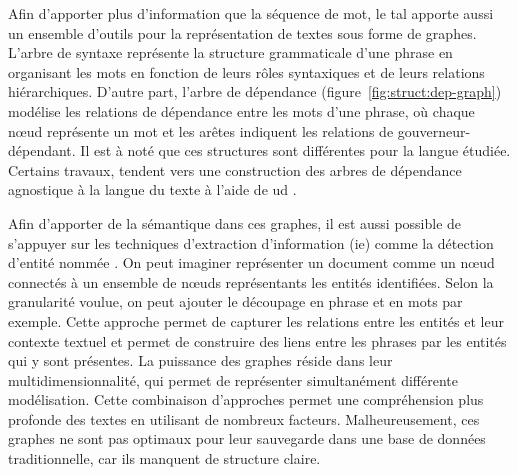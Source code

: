 Afin d'apporter plus d'information que la séquence de mot, le \gls{tal} apporte aussi un ensemble d'outils pour la représentation de textes sous forme de graphes.
L'arbre de syntaxe représente la structure grammaticale d'une phrase en organisant les mots en fonction de leurs rôles syntaxiques et de leurs relations hiérarchiques.
D'autre part, l'arbre de dépendance (figure~\ref{fig:struct:dep-graph}) modélise les relations de dépendance entre les mots d'une phrase, où chaque nœud représente un mot et les arêtes indiquent les relations de gouverneur-dépendant.
Il est à noté que ces structures sont différentes pour la langue étudiée.
Certains travaux, tendent vers une construction des arbres de dépendance agnostique à la langue du texte à l'aide de \gls{ud} \cite{nivreUniversalGrammarNatural2015}.

Afin d'apporter de la sémantique dans ces graphes, il est aussi possible de s'appuyer sur les techniques d'extraction d'information (\acrshort{ie}) comme la détection d'entité nommée \cite{patel-schneiderUsingDescriptionLogics2015}.
On peut imaginer représenter un document comme un nœud connectés à un ensemble de nœuds représentants les entités identifiées.
Selon la granularité voulue, on peut ajouter le découpage en phrase et en mots par exemple.
Cette approche permet de capturer les relations entre les entités et leur contexte textuel et permet de construire des liens entre les phrases par les entités qui y sont présentes.
La puissance des graphes réside dans leur multidimensionnalité, qui permet de représenter simultanément différente modélisation.
Cette combinaison d'approches permet une compréhension plus profonde des textes en utilisant de nombreux facteurs.
Malheureusement, ces graphes ne sont pas optimaux pour leur sauvegarde dans une base de données traditionnelle, car ils manquent de structure claire.

